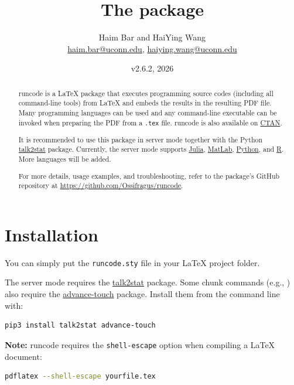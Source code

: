 \documentclass{ltxdoc}
\title{The \pkg{runcode} package}
\author{Haim Bar and HaiYing Wang \\
  \href{mailto:haim.bar@uconn.edu}{haim.bar@uconn.edu},
  \href{mailto:haiying.wang@uconn.edu}{haiying.wang@uconn.edu}}
\date{v2.6.2, 2026}
\newcommand{\pkg}[1]{\textsf{#1}}
\newcommand{\file}[1]{\texttt{#1}}
\begin{document}
\maketitle

\begin{abstract}
\pkg{runcode} is a \LaTeX{} package that executes programming source
codes (including all command-line tools) from \LaTeX{} and embeds the
results in the resulting PDF file.  Many programming languages can be
used and any command-line executable can be invoked when preparing the
PDF from a \texttt{.tex} file.  \pkg{runcode} is also available on
\href{https://ctan.org/pkg/runcode}{CTAN}.

It is recommended to use this package in server mode together with the
Python \href{https://pypi.org/project/talk2stat/}{talk2stat} package.
Currently, the server mode supports
\href{https://julialang.org/}{Julia},
\href{https://www.mathworks.com/products/matlab.html}{MatLab},
\href{https://www.python.org/}{Python}, and
\href{https://www.r-project.org/}{R}.
More languages will be added.

For more details, usage examples, and troubleshooting, refer to the
package's GitHub repository at
\url{https://github.com/Ossifragus/runcode}.
\end{abstract}

\tableofcontents

\section{Installation}
\label{sec:installation}

You can simply put the \file{runcode.sty} file in your \LaTeX{} project
folder.

The server mode requires the
\href{https://pypi.org/project/talk2stat/}{talk2stat} package.
Some chunk commands (e.g., ) also require the
\href{https://pypi.org/project/advance-touch/}{advance-touch} package.
Install them from the command line with:
\begin{lstlisting}[language=bash]
pip3 install talk2stat advance-touch
\end{lstlisting}

\textbf{Note:} \pkg{runcode} requires the \texttt{shell-escape} option
when compiling a \LaTeX{} document:
\begin{lstlisting}[language=bash]
pdflatex --shell-escape yourfile.tex
\end{lstlisting}
\end{document}
